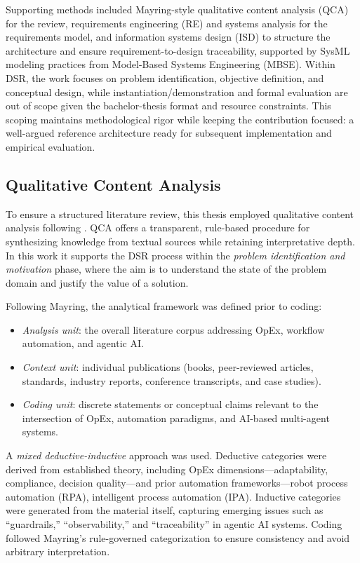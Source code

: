 Supporting methods included Mayring-style qualitative content analysis (QCA) for the review, requirements engineering (RE) and systems analysis for the requirements model, and information systems design (ISD) to structure the architecture and ensure requirement-to-design traceability, supported by SysML modeling practices from Model-Based Systems Engineering (MBSE). Within DSR, the work focuses on problem identification, objective definition, and conceptual design, while instantiation/demonstration and formal evaluation are out of scope given the bachelor-thesis format and resource constraints. This scoping maintains methodological rigor while keeping the contribution focused: a well-argued reference architecture ready for subsequent implementation and empirical evaluation.

\subsection{Qualitative Content Analysis}\label{subsec:qca}
To ensure a structured literature review, this thesis employed qualitative content analysis following \textcite{mayringQualitative2022}. 
QCA offers a transparent, rule-based procedure for synthesizing knowledge from textual sources while retaining interpretative depth. 
In this work it supports the DSR process \parencite{peffersDesign2007} within the \emph{problem identification and motivation} phase, 
where the aim is to understand the state of the problem domain and justify the value of a solution.

Following Mayring, the analytical framework was defined prior to coding:
\begin{itemize}
    \item \textit{Analysis unit}: the overall literature corpus addressing OpEx, workflow automation, and agentic AI.\@
    \item \textit{Context unit}: individual publications (books, peer-reviewed articles, standards, industry reports, conference transcripts, and case studies).
    \item \textit{Coding unit}: discrete statements or conceptual claims relevant to the intersection of OpEx, automation paradigms, and AI-based multi-agent systems.
\end{itemize}

A \emph{mixed deductive-inductive} approach was used. Deductive categories were derived from established theory, including OpEx dimensions---adaptability, compliance, decision quality---and prior automation frameworks---robot process automation (RPA), intelligent process automation (IPA). 
Inductive categories were generated from the material itself, capturing emerging issues such as ``guardrails,'' ``observability,'' and ``traceability'' in agentic AI systems. 
Coding followed Mayring's rule-governed categorization to ensure consistency and avoid arbitrary interpretation.

